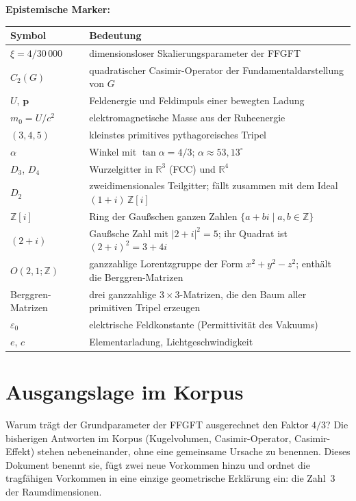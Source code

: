 \medskip
\textbf{Epistemische Marker:}\par\medskip


\medskip
\begin{tabular}{@{}lp{10.5cm}@{}}
\toprule
\textbf{Symbol} & \textbf{Bedeutung} \\
\midrule
$\xi=4/30\,000$ & dimensionsloser Skalierungsparameter der FFGFT \\
$C_2(G)$ & quadratischer Casimir-Operator der Fundamentaldarstellung von $G$ \\
$U$, $\mathbf p$ & Feldenergie und Feldimpuls einer bewegten Ladung \\
$m_0 = U/c^2$ & elektromagnetische Masse aus der Ruheenergie \\
$(3,4,5)$ & kleinstes primitives pythagoreisches Tripel \\
$\alpha$ & Winkel mit $\tan\alpha = 4/3$; $\alpha \approx 53{,}13^\circ$ \\
$D_3$, $D_4$ & Wurzelgitter in $\mathbb R^3$ (FCC) und $\mathbb R^4$ \\
$D_2$       & zweidimensionales Teilgitter; fällt zusammen mit dem Ideal $(1+i)\,\mathbb Z[i]$ \\
$\mathbb Z[i]$ & Ring der Gaußschen ganzen Zahlen $\{a+bi \mid a,b\in\mathbb Z\}$ \\
$(2+i)$     & Gaußsche Zahl mit $|2+i|^2 = 5$; ihr Quadrat ist $(2+i)^2 = 3+4i$ \\
$O(2,1;\mathbb Z)$ & ganzzahlige Lorentzgruppe der Form $x^2+y^2-z^2$; enthält die Berggren-Matrizen \\
Berggren-Matrizen & drei ganzzahlige $3\times3$-Matrizen, die den Baum aller primitiven Tripel erzeugen \\
$\varepsilon_0$ & elektrische Feldkonstante (Permittivität des Vakuums) \\
$e$, $c$    & Elementarladung, Lichtgeschwindigkeit \\
\bottomrule
\end{tabular}

\section{Ausgangslage im Korpus}
\label{sec:ausgang}

Warum trägt der Grundparameter der FFGFT ausgerechnet den Faktor $4/3$?
Die bisherigen Antworten im Korpus (Kugelvolumen, Casimir-Operator, Casimir-Effekt)
stehen nebeneinander, ohne eine gemeinsame Ursache zu benennen. Dieses Dokument
benennt sie, fügt zwei neue Vorkommen hinzu und ordnet die tragfähigen Vorkommen in eine einzige
geometrische Erklärung ein: die Zahl~3 der Raumdimensionen.

